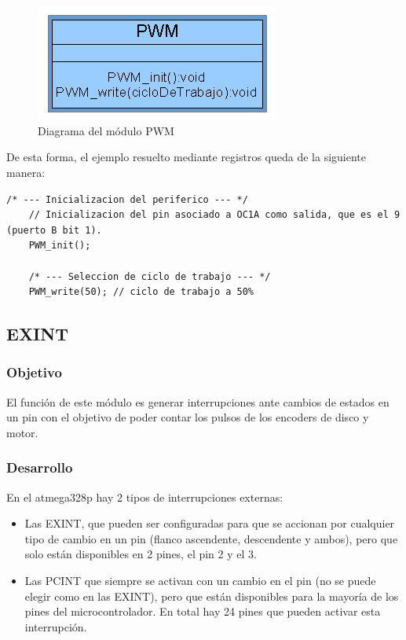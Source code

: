 \begin{figure}[!ht]
	\centering
	\includegraphics[width=8cm,scale=1]{resources/3_4-moduloPWM.png}
	\caption{Diagrama del módulo PWM}
	\label{fig:\thefigure}
\end{figure}

De esta forma, el ejemplo resuelto mediante registros queda de la siguiente manera:

\begin{lstlisting}[style=CStyle]
	/* --- Inicializacion del periferico --- */
	// Inicializacion del pin asociado a OC1A como salida, que es el 9 (puerto B bit 1).
	PWM_init();
	
	/* --- Seleccion de ciclo de trabajo --- */
	PWM_write(50); // ciclo de trabajo a 50%
\end{lstlisting}

\subsection{EXINT}
\subsubsection{Objetivo}
El función de este módulo es generar interrupciones ante cambios de estados en un pin con el objetivo de poder contar los pulsos de los encoders de disco y motor.

\subsubsection{Desarrollo}
En el atmega328p hay 2 tipos de interrupciones externas:
\begin{itemize} 
	\item Las EXINT, que pueden ser configuradas para que se accionan por cualquier tipo de cambio en un pin (flanco ascendente, descendente y ambos), pero que solo están disponibles en 2 pines, el pin 2 y el 3.
	\item Las PCINT que siempre se activan con un cambio en el pin (no se puede elegir como en las EXINT), pero que están disponibles para la mayoría de los pines del microcontrolador. En total hay 24 pines que pueden activar esta interrupción.
\end{itemize}

